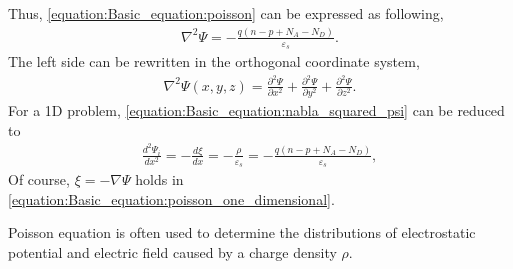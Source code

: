 \documentclass[letterpaper,10pt,english]{sphinxmanual}
\numberwithin{equation}{section}
\begin{document}
\sphinxAtStartPar
Thus, \eqref{equation:Basic_equation:poisson} can be expressed as following,
\begin{equation}\label{equation:Basic_equation:poisson_electric_charge}
\begin{split}\nabla^2\Psi = -\frac{q(n - p + N_A - N_D)}{\varepsilon_s}.\end{split}
\end{equation}
\sphinxAtStartPar
The left side can be rewritten in the orthogonal coordinate system,
\begin{equation}\label{equation:Basic_equation:nabla_squared_psi}
\begin{split}\nabla^2\Psi(x, y, z) = \frac{\partial^2\Psi}{\partial x^2} + \frac{\partial^2\Psi}{\partial y^2} + \frac{\partial^2\Psi}{\partial z^2}.\end{split}
\end{equation}
\sphinxAtStartPar
For a 1D problem, \eqref{equation:Basic_equation:nabla_squared_psi} can be reduced to
\begin{equation}\label{equation:Basic_equation:poisson_one_dimensional}
\begin{split}\frac{d^2\Psi_i}{d x^2} = -\frac{d\xi}{dx} = -\frac{\rho}{\varepsilon_s} =  -\frac{q(n - p + N_A - N_D)}{\varepsilon_s},\end{split}
\end{equation}
\sphinxAtStartPar
Of course, \(\xi = - \nabla\Psi\) holds in \eqref{equation:Basic_equation:poisson_one_dimensional}.

\sphinxAtStartPar
Poisson equation is often used to determine the distributions of electrostatic potential and electric field caused by a charge density \(\rho\).
\end{document}

